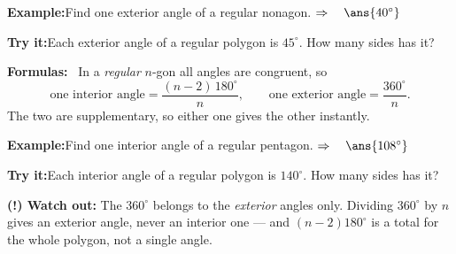 \documentclass[12pt]{article}
\begin{document}
\begin{examplebox}
\textbf{Example:}\quad Find one exterior angle of a regular nonagon.
$\Rightarrow\quad \ans{40^\circ}$
\end{examplebox}

\begin{tryitbox}
\textbf{Try it:}\quad Each exterior angle of a regular polygon is $45^\circ$.
How many sides has it?\\[2pt]
\end{tryitbox}


\begin{formulabox}
\textbf{Formulas:} \ In a \emph{regular} $n$-gon all angles are congruent, so
\[
  \text{one interior angle} = \frac{(n - 2)\,180^\circ}{n},
  \qquad
  \text{one exterior angle} = \frac{360^\circ}{n}.
\]
The two are supplementary, so either one gives the other instantly.
\end{formulabox}

\begin{examplebox}
\textbf{Example:}\quad Find one interior angle of a regular pentagon.
$\Rightarrow\quad \ans{108^\circ}$
\end{examplebox}

\begin{tryitbox}
\textbf{Try it:}\quad Each interior angle of a regular polygon is $140^\circ$.
How many sides has it?\\[2pt]
\end{tryitbox}

\begin{watchoutbox}
\textbf{(!) Watch out:} The $360^\circ$ belongs to the \emph{exterior} angles only.
Dividing $360^\circ$ by $n$ gives an exterior angle, never an interior one --- and
$(n-2)180^\circ$ is a total for the whole polygon, not a single angle.
\end{watchoutbox}
\end{document}
